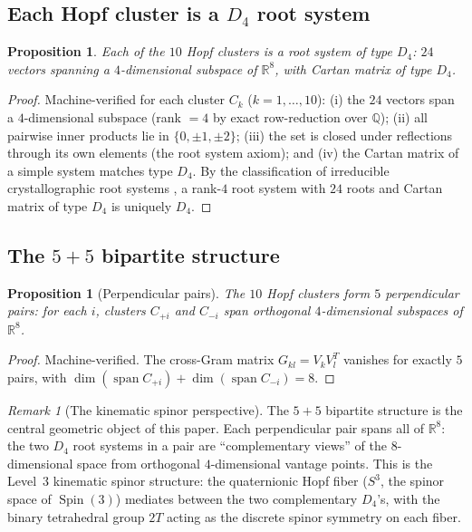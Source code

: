 \documentclass[11pt,reqno]{amsart}
\theoremstyle{plain}
\newtheorem{proposition}[theorem]{Proposition}
\theoremstyle{definition}
\theoremstyle{remark}
\newtheorem{remark}[theorem]{Remark}
\newcommand{\R}{\mathbb{R}}
\DeclareMathOperator{\Spin}{Spin}
\begin{document}
\subsection{Each Hopf cluster is a $D_4$ root system}

\begin{proposition}\label{prop:D4clusters}
Each of the $10$ Hopf clusters is a root system of type $D_4$:
$24$ vectors spanning a $4$-dimensional subspace of $\R^8$,
with Cartan matrix of type $D_4$.
\end{proposition}

\begin{proof}
Machine-verified for each cluster $C_k$ ($k=1,\ldots,10$):
(i) the $24$ vectors span a $4$-dimensional subspace
(rank $= 4$ by exact row-reduction over $\mathbb{Q}$);
(ii) all pairwise inner products lie in $\{0, \pm 1, \pm 2\}$;
(iii) the set is closed under reflections through its own
elements (the root system axiom); and
(iv) the Cartan matrix of a simple system matches type $D_4$.
By the classification of irreducible crystallographic root systems
\cite{Humphreys1990}, a rank-$4$ root system with $24$ roots
and Cartan matrix of type $D_4$ is uniquely $D_4$.
\end{proof}

\subsection{The $5+5$ bipartite structure}

\begin{proposition}[Perpendicular pairs]\label{prop:perppairs}
The $10$ Hopf clusters form $5$ perpendicular pairs:
for each $i$, clusters $C_{+i}$ and $C_{-i}$ span
orthogonal $4$-dimensional subspaces of $\R^8$.
\end{proposition}

\begin{proof}
Machine-verified.
The cross-Gram matrix $G_{kl} = V_k V_l^T$ vanishes for
exactly $5$ pairs, with
$\dim(\operatorname{span}C_{+i}) +
\dim(\operatorname{span}C_{-i}) = 8$.
\end{proof}

\begin{remark}[The kinematic spinor perspective]
\label{rem:bipartitekinematic}
The $5+5$ bipartite structure is the central geometric object
of this paper.
Each perpendicular pair spans all of $\R^8$:
the two $D_4$ root systems in a pair are ``complementary
views'' of the $8$-dimensional space from orthogonal
$4$-dimensional vantage points.
This is the Level~3 kinematic spinor structure:
the quaternionic Hopf fiber ($S^3$, the spinor space of
$\Spin(3)$) mediates between the two complementary $D_4$'s,
with the binary tetrahedral group $2T$ acting as the discrete
spinor symmetry on each fiber.
\end{remark}
\end{document}
